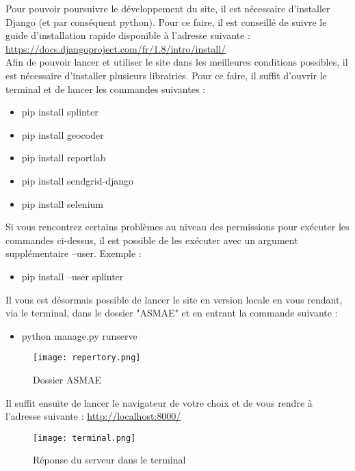 Pour pouvoir poursuivre le développement du site, il est nécessaire d’installer Django (et par conséquent python). Pour ce faire, il est conseillé de suivre le guide d’installation rapide disponible à l’adresse suivante : \href{https://docs.djangoproject.com/fr/1.8/intro/install/}{https://docs.djangoproject.com/fr/1.8/intro/install/}\\

Afin de pouvoir lancer et utiliser le site dans les meilleures conditions possibles, il est nécessaire d’installer plusieurs librairies. Pour ce faire, il suffit d’ouvrir le terminal et de lancer les commandes suivantes :\\
\begin{itemize}
\item pip install splinter
\item pip install geocoder
\item pip install reportlab
\item pip install sendgrid-django
\item pip install selenium\\
\end{itemize}

Si vous rencontrez certains problèmes au niveau des permissions pour exécuter les commandes ci-dessus, il est possible de les exécuter avec un argument supplémentaire --user. Exemple :\\
\begin{itemize}
\item pip install --user splinter\\
\end{itemize}

Il vous est désormais possible de lancer le site en version locale en vous rendant, via le terminal, dans le dossier "ASMAE" et en entrant la commande suivante :\\
\begin{itemize}
\item python manage.py runserve\\
\end{itemize}

\begin{figure}[H]
\centering
\texttt{[image: repertory.png]}
\caption{Dossier ASMAE}
\end{figure}

Il suffit ensuite de lancer le navigateur de votre choix et de vous rendre à l’adresse suivante : \href{http://localhost:8000/}{http://localhost:8000/}

\begin{figure}[H]
\centering
\texttt{[image: terminal.png]}
\caption{Réponse du serveur dans le terminal}
\end{figure}